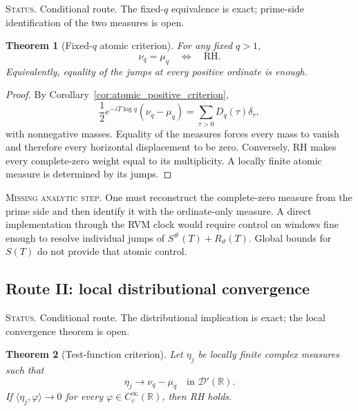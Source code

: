 \documentclass[11pt]{amsart}
\numberwithin{equation}{section}
\theoremstyle{plain}
\newtheorem{theorem}{Theorem}[section]
\theoremstyle{definition}
\theoremstyle{remark}
\newcommand{\RH}{\mathrm{RH}}
\newcommand{\1}{\mathbf{1}}
\newcommand{\statusnote}[1]{%
  \par\smallskip\noindent
  \begingroup\footnotesize\textsc{Status.} #1\endgroup
  \par\smallskip}
\newcommand{\missingnote}[1]{%
  \par\smallskip\noindent
  \begingroup\footnotesize\textsc{Missing analytic step.} #1\endgroup
  \par\smallskip}
\begin{document}
\statusnote{Conditional route.  The fixed-$q$ equivalence is exact; prime-side identification of the two measures is open.}
\begin{theorem}[Fixed-\(q\) atomic criterion]
\label{thm:route_fixed_q_atomic}
For any fixed $q>1$,
\begin{equation}
\nu_q=\mu_q
\quad\Longleftrightarrow\quad
\RH.
\label{eq:route_fixed_q_atomic}
\end{equation}
Equivalently, equality of the jumps at every positive ordinate is enough.
\end{theorem}

\begin{proof}
By Corollary~\ref{cor:atomic_positive_criterion},
\begin{equation}
\frac12e^{-iT\log q}(\nu_q-\mu_q)
=
\sum_{\tau>0}D_q(\tau)\delta_\tau,
\label{eq:route_atomic_positive_measure}
\end{equation}
with nonnegative masses.  Equality of the measures forces every mass to
vanish and therefore every horizontal displacement to be zero.  Conversely,
RH makes every complete-zero weight equal to its multiplicity.  A locally
finite atomic measure is determined by its jumps.
\end{proof}

\missingnote{One must reconstruct the complete-zero measure from the prime side
and then identify it with the ordinate-only measure.  A direct implementation
through the RVM clock would require control on windows fine enough to resolve
individual jumps of $S^{\#}(T)+R_\vartheta(T)$.  Global bounds for $S(T)$ do
not provide that atomic control.}

\subsection{Route II: local distributional convergence}
\label{subsec:route_distributional}

\statusnote{Conditional route.  The distributional implication is exact; the local convergence theorem is open.}
\begin{theorem}[Test-function criterion]
\label{thm:test_function_criterion}
Let $\eta_j$ be locally finite complex measures such that
\begin{equation}
\eta_j\longrightarrow\nu_q-\mu_q
\quad\text{in }\mathcal D'(\mathbb R).
\label{eq:test_measure_identification}
\end{equation}
If $\langle\eta_j,\varphi\rangle\to0$ for every
$\varphi\in C_c^\infty(\mathbb R)$, then RH holds.
\end{theorem}
\end{document}
